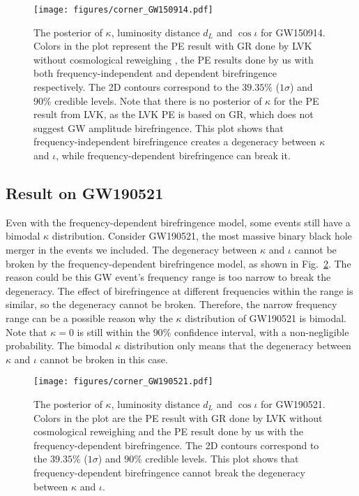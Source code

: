 \documentclass[aps,prd,twocolumn,superscriptaddress,preprintnumbers,floatfix,nofootinbib]{revtex4-2}
\begin{document}
\begin{figure}
    \texttt{[image: figures/corner\_GW150914.pdf]}
    \caption{
        The posterior of $\kappa$, luminosity distance $d_L$ and $\cos{\iota}$ for GW150914.
        Colors in the plot represent the \ac{PE} result with GR done by LVK without cosmological reweighing \citep{GWTC-2.1, GWTC-3, GWTC-2.1_dataset, GWTC-3_dataset}, the \ac{PE} results done by us with both frequency-independent and dependent birefringence respectively.
        The 2D contours correspond to the $39.35\%$ ($1\sigma$) and $90\%$ credible levels.
        Note that there is no posterior of $\kappa$ for the \ac{PE} result from LVK, as the LVK \ac{PE} is based on GR, which does not suggest GW amplitude birefringence.
        This plot shows that frequency-independent birefringence creates a degeneracy between $\kappa$ and $\iota$, while frequency-dependent birefringence can break it.
    }
    \label{fig:corner_GW150914}
\end{figure}

\subsection{Result on GW190521}
Even with the frequency-dependent birefringence model, some events still have a bimodal $\kappa$ distribution.
Consider GW190521, the most massive binary black hole merger in the events we included.
The degeneracy between $\kappa$ and $\iota$ cannot be broken by the frequency-dependent birefringence model, as shown in Fig.~\ref{fig:corner_GW190521}.
The reason could be this GW event's frequency range is too narrow to break the degeneracy.
The effect of birefringence at different frequencies within the range is similar, so the degeneracy cannot be broken.
Therefore, the narrow frequency range can be a possible reason why the $\kappa$ distribution of GW190521 is bimodal.
Note that $\kappa=0$ is still within the $90\%$ confidence interval, with a non-negligible probability.
The bimodal $\kappa$ distribution only means that the degeneracy between $\kappa$ and $\iota$ cannot be broken in this case.

\begin{figure}[h]
    \texttt{[image: figures/corner\_GW190521.pdf]}
    \caption{
        The posterior of $\kappa$, luminosity distance $d_L$ and $\cos{\iota}$ for GW190521.
        Colors in the plot are the \ac{PE} result with GR done by LVK without cosmological reweighing \citep{GWTC-2.1, GWTC-3, GWTC-2.1_dataset, GWTC-3_dataset} and the \ac{PE} result done by us with the frequency-dependent birefringence.
        The 2D contours correspond to the $39.35\%$ ($1\sigma$) and $90\%$ credible levels.
        This plot shows that frequency-dependent birefringence cannot break the degeneracy between $\kappa$ and $\iota$.
    }
    \label{fig:corner_GW190521}
\end{figure}
\end{document}
